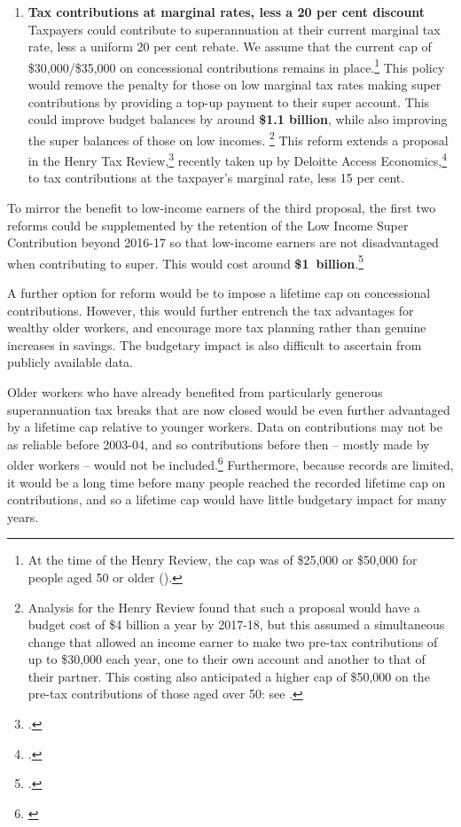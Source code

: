\begin{enumerate}
\item 
{\textbf{Tax contributions at marginal rates, less a 20 per cent discount}}\\
Taxpayers could contribute to superannuation at their current marginal tax rate, less a uniform 20 per cent rebate. We assume that the current cap of \$30,000/\$35,000 on concessional contributions remains in place.\footnote{At the time of the Henry Review, the cap was of \$25,000 or \$50,000 for people aged 50 or older (\textcite[][100]{HenryTaxReview2010}).}  This policy would remove the penalty for those on low marginal tax rates making super contributions by providing a top-up payment to their super account. This could improve budget balances by around \textbf{\$1.1 billion}, while also improving the super balances of those on low incomes.%
\footnote{Analysis for the Henry Review found that such a proposal would have a budget cost of \$4 billion\DEVIATION{} a year by 2017-18, but this assumed a simultaneous change that allowed an income earner to make two pre-tax contributions of up to \$30,000 each year, one to their own account and another to that of their partner. This costing also anticipated a higher cap of \$50,000 on the pre-tax contributions of those aged over 50: see \textcites{Treasury2010SuperAdditionalMaterial}[][95]{HenryTaxReview2010}.}  
This reform extends a proposal in the Henry Tax Review,\footcite[][102]{Treasury2010IGR}  recently taken up by Deloitte Access Economics,\footcite{Deloitte2015TaxReformSheddingLight}  to tax contributions at the taxpayer’s marginal rate, less 15 per cent.
\end{enumerate}

To mirror the benefit to low-income earners of the third proposal, the first two reforms could be supplemented by the retention of the Low Income Super Contribution beyond 2016-17 so that low-income earners are not disadvantaged when contributing to super. This would cost around \textbf{\$1~billion}.\footcite[][Table~2.16, p.~206]{Treasury2013PortfolioBudgetStatement1314}

A further option for reform would be to impose a lifetime cap on concessional contributions. However, this would further entrench the tax advantages for wealthy older workers, and encourage more tax planning rather than genuine increases in savings. The budgetary impact is also difficult to ascertain from publicly available data. 

Older workers who have already benefited from particularly generous superannuation tax breaks that are now closed would be even further advantaged by a lifetime cap relative to younger workers. Data on contributions may not be as reliable before 2003-04, and so contributions before then – mostly made by older workers – would not be included.\footnote{\textcites{SuperContrTaxRegs1997}{ATO2003}{ATO2008}{ATO2014g}{ATO2014h}} Furthermore, because records are limited, it would be a long time before many people reached the recorded lifetime cap on contributions, and so a lifetime cap would have little budgetary impact for many years.

